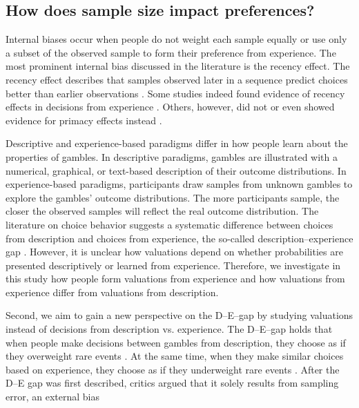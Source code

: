 \subsection{How does sample size impact preferences?}

Internal biases occur when people do not weight each sample equally or use only a subset of the observed sample to form their preference from experience. The most prominent internal bias discussed in the literature is the recency effect. The recency effect describes that samples observed later in a sequence predict choices better than earlier observations \citep[e.g.,][]{Hertwig2004,Rakow2008}. Some studies indeed found evidence of recency effects in decisions from experience \citep[e.g.,][]{Hertwig2004,Rakow2008}. Others, however, did not \citep[e.g.,][]{Hau2008,Ungemach2009} or even showed evidence for primacy effects instead \citep[e.g.,][]{Camilleri2011}. 


Descriptive and experience-based paradigms differ in how people learn about the properties of gambles. In descriptive paradigms, gambles are illustrated with a numerical, graphical, or text-based description of their outcome distributions. In experience-based paradigms, participants draw samples from unknown gambles to explore the gambles' outcome distributions. The more participants sample, the closer the observed samples will reflect the real outcome distribution. 
The literature on choice behavior suggests a systematic difference between choices from description and choices from experience, the so-called description--experience gap \citep[D--E gap;][]{Hertwig2004}. However, it is unclear how valuations depend on whether probabilities are presented descriptively or learned from experience. Therefore, we investigate in this study how people form valuations from experience and how valuations from experience differ from valuations from description. 



Second, we aim to gain a new perspective on the D--E--gap by studying valuations instead of decisions from description vs. experience. The D--E--gap holds that when people make decisions between gambles from description, they choose as if they overweight rare events \citep{Kahneman1979}. At the same time, when they make similar choices based on experience, they choose as if they underweight rare events \citep{Hertwig2004}. After the D--E gap was first described, critics argued that it solely results from sampling error, an external bias \citep{Hadar2009}

